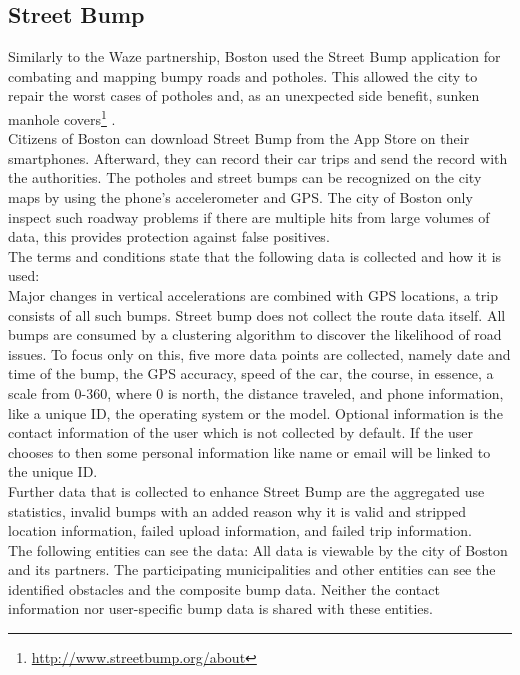 \documentclass[a4paper,12pt]{report}
\begin{document}
		\subsection[Street Bump]{Street Bump \cite{EGG17}}
		\startsubsection
			Similarly to the Waze partnership, Boston used the Street Bump application for combating and mapping bumpy roads and potholes. 
			This allowed the city to repair the worst cases of potholes and, as an unexpected side benefit, sunken manhole covers\footnote{\url{http://www.streetbump.org/about}} \cite{BostonStreetBumpTOS}. \\
			Citizens of Boston can download Street Bump from the App Store on their smartphones. 
			Afterward, they can record their car trips and send the record with the authorities. 
			The potholes and street bumps can be recognized on the city maps by using the phone's accelerometer and GPS. 
			The city of Boston only inspect such roadway problems if there are multiple hits from large volumes of data, this provides protection against false positives.\\
			The terms and conditions state that the following data is collected and how it is used:\\
			Major changes in vertical accelerations are combined with GPS locations, a trip consists of all such bumps. 
			Street bump does not collect the route data itself. 
			All bumps are consumed by a clustering algorithm to discover the likelihood of road issues. 
			To focus only on this, five more data points are collected, namely date and time of the bump, the GPS accuracy, speed of the car, the course, in essence, a scale from 0-360, where 0 is north, the distance traveled, and phone information, like a unique ID, the operating system or the model.
			Optional information is the contact information of the user which is not collected by default. 
			If the user chooses to then some personal information like name or email will be linked to the unique ID.\\
			Further data that is collected to enhance Street Bump are the aggregated use statistics, invalid bumps with an added reason why it is valid and stripped location information, failed upload information, and failed trip information.\\
			The following entities can see the data:
			All data is viewable by the city of Boston and its partners. 
			The participating municipalities and other entities can see the identified obstacles and the composite bump data.
			Neither the contact information nor user-specific bump data is shared with these entities.
\end{document}
